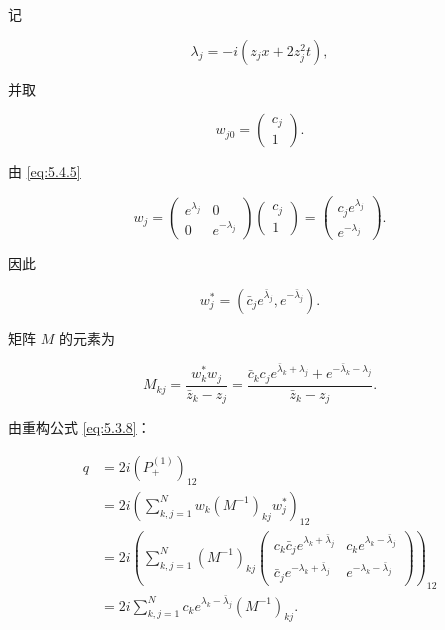 \documentclass[
    lang=cn,
    scheme=chinese,
    mode=simple,
    device=normal,
    color=blue,
    math=cm,
    thmcnt=section,
    12pt,
    nowatermark
]{elegantbook}
\begin{document}
记

\[
    \lambda_j
    =
    -i(z_jx+2z_j^2t),
\]

并取

\[
    w_{j0}
    =
    \begin{pmatrix}
        c_j \\1
    \end{pmatrix}.
\]

由 \eqref{eq:5.4.5}

\begin{equation}
    w_j
    =
    \begin{pmatrix}
        e^{\lambda_j} & 0              \\
        0             & e^{-\lambda_j}
    \end{pmatrix}
    \begin{pmatrix}
        c_j \\1
    \end{pmatrix}
    =
    \begin{pmatrix}
        c_je^{\lambda_j} \\
        e^{-\lambda_j}
    \end{pmatrix}.
    \tag{5.4.10}
    \label{eq:5.4.10}
\end{equation}

因此

\begin{equation}
    w_j^*
    =
    \left(
    \bar c_je^{\bar\lambda_j},
    e^{-\bar\lambda_j}
    \right).
    \tag{5.4.11}
    \label{eq:5.4.11}
\end{equation}

矩阵 $M$ 的元素为

\begin{equation}
    M_{kj}
    =
    \dfrac{w_k^*w_j}{\bar z_k-z_j}
    =
    \dfrac{
        \bar c_kc_je^{\bar\lambda_k+\lambda_j}
        +
        e^{-\bar\lambda_k-\lambda_j}
    }{
        \bar z_k-z_j
    }.
    \tag{5.4.12}
    \label{eq:5.4.12}
\end{equation}

由重构公式 \eqref{eq:5.3.8}：

\begin{equation}
    \begin{aligned}
        q
        & =
        2i(P_+^{(1)})_{12} \\
        & =
        2i\left(
        \sum\limits_{k,j=1}^{N}
        w_k(M^{-1})_{kj}w_j^*
        \right)_{12} \\
        & =
        2i\left(
        \sum\limits_{k,j=1}^{N}
        (M^{-1})_{kj}
        \begin{pmatrix}
            c_k\bar c_j e^{\lambda_k+\bar\lambda_j}
            & c_ke^{\lambda_k-\bar\lambda_j} \\
            \bar c_j e^{-\lambda_k+\bar\lambda_j}
            & e^{-\lambda_k-\bar\lambda_j}
        \end{pmatrix}
        \right)_{12} \\
        & =
        2i
        \sum\limits_{k,j=1}^{N}
        c_ke^{\lambda_k-\bar\lambda_j}(M^{-1})_{kj}.
    \end{aligned}
    \tag{5.4.13}
    \label{eq:5.4.13}
\end{equation}
\end{document}
